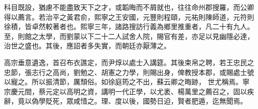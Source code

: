 \begin{pinyinscope}
 科目既設，猶慮不能盡致天下之才，或韜晦而不屑就也，往往命州郡搜羅，而公卿得以薦言。若治平之黃君俞，熙寧之王安國，元豐則程頤，元祐則陳師道，元符則
 徐積，皆卓然較著者也。熙寧三年，諸路搜訪行義為鄉里推重者，凡二十有九人。至，則館之太學，而劉蒙以下二十二人試舍人院，賜官有差，亦足以見幽隱必達，治世之盛也。其後，應詔者多失實，而朝廷亦厭薄之。



 高宗垂意遺逸，首召布衣譙定，而尹焞以處士入講筵。其後束帛之聘，若王忠民之忠節，張志行之高尚，劉勉之、胡憲之力學，則賜出身，俾教授本郡，或賜處士號以寵之。所以振清節，厲頹俗。如徐庭筠之不出，蘇云卿之晦跡，
 世尤稱焉。寧宗慶元間，蔡元定以高明之資，講明一代正學，以尤袤、楊萬里之薦召之，固以疾辭，竟以偽學貶死，眾咸惜之。理、度以後，國勢日迫，賢者肥遁，迄無聞焉。



\end{pinyinscope}